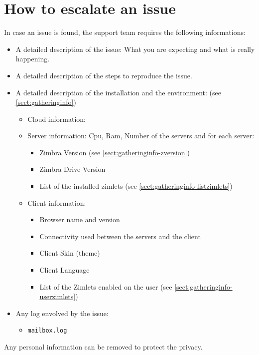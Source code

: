 \section[Escalate an issue]{How to escalate an issue}
\label{==sect:how_to_escalate_an_issue==}
    In case an issue is found, the support team requires the following informations:
    \begin{itemize}
        \item A detailed description of the issue: What you are expecting and what is really happening.
        \item A detailed description of the steps to reproduce the issue.
        \item A detailed description of the installation and the environment: (see \autoref{sect:gatheringinfo})
        \begin{itemize}
            \item Cloud information: 
            \item Server information: Cpu, Ram, Number of the servers and for each server:
            \begin{itemize}
                \item Zimbra Version (see \autoref{sect:gatheringinfo-zversion})
                \item Zimbra Drive Version
                \item List of the installed zimlets (see \autoref{sect:gatheringinfo-listzimlets})
            \end{itemize}
            \item Client information:
            \begin{itemize}
                \item Browser name and version
                \item Connectivity used between the servers and the client
                \item Client Skin (theme)
                \item Client Language
                \item List of the Zimlets enabled on the user (see \autoref{sect:gatheringinfo-userzimlets})
            \end{itemize}
        \end{itemize}
        \item Any log envolved by the issue:
        \begin{itemize}
            \item \texttt{mailbox.log}
        \end{itemize}
    \end{itemize}
    Any personal information can be removed to protect the privacy.
